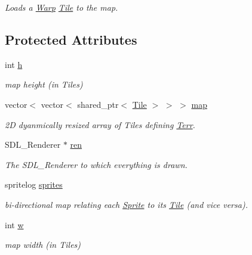 \begin{DoxyCompactItemize}
\begin{DoxyCompactList}\small\item\em Loads a \hyperlink{class_warp}{Warp} \hyperlink{class_tile}{Tile} to the map. \end{DoxyCompactList}\end{DoxyCompactItemize}
\subsection*{Protected Attributes}
\begin{DoxyCompactItemize}
\item 
int \hyperlink{class_terr_aa2f06b09cb8abd0fda4abb2b696f6885}{h}\hypertarget{class_terr_aa2f06b09cb8abd0fda4abb2b696f6885}{}\label{class_terr_aa2f06b09cb8abd0fda4abb2b696f6885}

\begin{DoxyCompactList}\small\item\em map height (in Tiles) \end{DoxyCompactList}\item 
vector$<$ vector$<$ shared\+\_\+ptr$<$ \hyperlink{class_tile}{Tile} $>$ $>$ $>$ \hyperlink{class_terr_a09bb829623ee8c32ab5ea1a41ccc9d1f}{map}\hypertarget{class_terr_a09bb829623ee8c32ab5ea1a41ccc9d1f}{}\label{class_terr_a09bb829623ee8c32ab5ea1a41ccc9d1f}

\begin{DoxyCompactList}\small\item\em 2D dyanmically resized array of Tiles defining \hyperlink{class_terr}{Terr}. \end{DoxyCompactList}\item 
S\+D\+L\+\_\+\+Renderer $\ast$ \hyperlink{class_terr_afb5f048d36c4633dffba85e9a959fc68}{ren}\hypertarget{class_terr_afb5f048d36c4633dffba85e9a959fc68}{}\label{class_terr_afb5f048d36c4633dffba85e9a959fc68}

\begin{DoxyCompactList}\small\item\em The S\+D\+L\+\_\+\+Renderer to which everything is drawn. \end{DoxyCompactList}\item 
spritelog \hyperlink{class_terr_a633f21d6e20c549f8006104ae4363bea}{sprites}\hypertarget{class_terr_a633f21d6e20c549f8006104ae4363bea}{}\label{class_terr_a633f21d6e20c549f8006104ae4363bea}

\begin{DoxyCompactList}\small\item\em bi-\/directional map relating each \hyperlink{class_sprite}{Sprite} to its \hyperlink{class_tile}{Tile} (and vice versa). \end{DoxyCompactList}\item 
int \hyperlink{class_terr_af1d43d8b2b20b19d005626831c1335fb}{w}\hypertarget{class_terr_af1d43d8b2b20b19d005626831c1335fb}{}\label{class_terr_af1d43d8b2b20b19d005626831c1335fb}

\begin{DoxyCompactList}\small\item\em map width (in Tiles) \end{DoxyCompactList}\end{DoxyCompactItemize}


